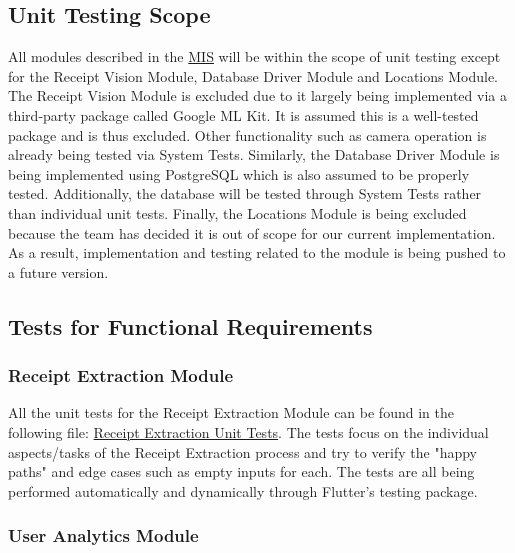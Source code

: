 \documentclass[12pt, titlepage]{article}
\begin{document}
\subsection{Unit Testing Scope}

  All modules described in the \href{https://github.com/r-yeh/grocery-spending-tracker/blob/master/docs/Design/SoftDetailedDes/MIS.pdf}{MIS}
  will be within the scope of unit testing except for the Receipt Vision Module, Database
  Driver Module and Locations Module. The Receipt Vision Module is excluded due to it largely being implemented via a third-party
  package called Google ML Kit. It is assumed this is a well-tested package and is thus excluded. Other functionality
  such as camera operation is already being tested via System Tests. Similarly, the Database Driver Module is being implemented
  using PostgreSQL which is also assumed to be properly tested. Additionally, the database will be tested through
  System Tests rather than individual unit tests. Finally, the Locations Module is being excluded because the team
  has decided it is out of scope for our current implementation. As a result, implementation and testing related to
  the module is being pushed to a future version.

\subsection{Tests for Functional Requirements}


  \subsubsection{Receipt Extraction Module}

  All the unit tests for the Receipt Extraction Module can be found in the following file: 
  \href{https://github.com/allanfang1/grocery_spending_tracker_app/blob/main/test/receipt_extraction_test.dart}{Receipt Extraction
  Unit Tests}. The tests focus on the individual aspects/tasks of the Receipt Extraction process and try to verify
  the "happy paths" and edge cases such as empty inputs for each. The tests are all being performed automatically
  and dynamically through Flutter's testing package.

\subsubsection{User Analytics Module}
\end{document}
